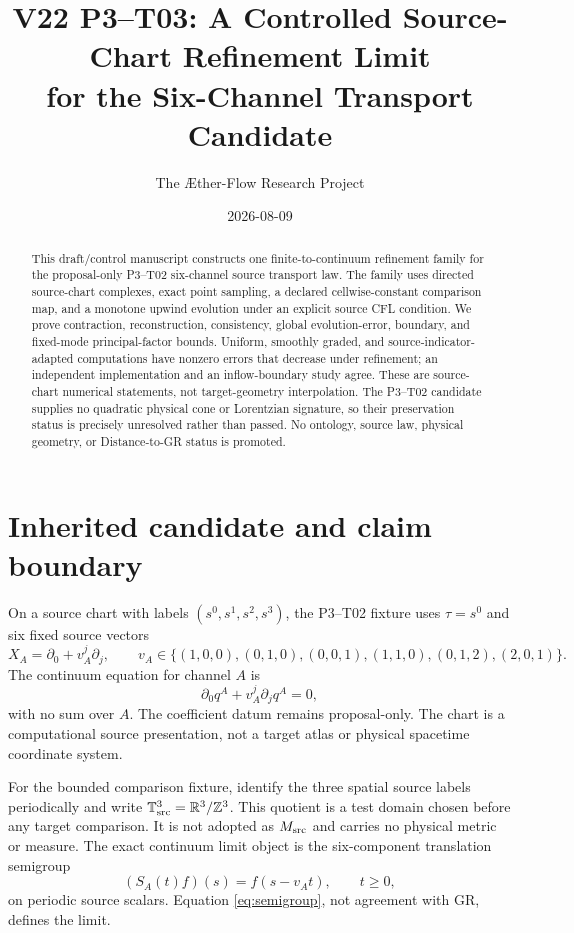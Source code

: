 \documentclass[11pt]{article}
\title{V22 P3--T03: A Controlled Source-Chart Refinement Limit\\
for the Six-Channel Transport Candidate}
\author{The \AE ther-Flow Research Project}
\date{2026-08-09}
\newcommand{\R}{\mathbb R}
\newcommand{\T}{\mathbb T}
\begin{document}
\maketitle

\begin{abstract}
This draft/control manuscript constructs one finite-to-continuum refinement
family for the proposal-only P3--T02 six-channel source transport law.  The
family uses directed source-chart complexes, exact point sampling, a declared
cellwise-constant comparison map, and a monotone upwind evolution under an
explicit source CFL condition.  We prove contraction, reconstruction,
consistency, global evolution-error, boundary, and fixed-mode
principal-factor bounds.  Uniform, smoothly graded, and source-indicator-
adapted computations have nonzero errors that decrease under refinement; an
independent implementation and an inflow-boundary study agree.  These are
source-chart numerical statements, not target-geometry interpolation.  The
P3--T02 candidate supplies no quadratic physical cone or Lorentzian signature,
so their preservation status is precisely unresolved rather than passed.  No
ontology, source law, physical geometry, or Distance-to-GR status is promoted.
\end{abstract}

\section{Inherited candidate and claim boundary}

On a source chart with labels $(s^0,s^1,s^2,s^3)$, the P3--T02 fixture uses
$\tau=s^0$ and six fixed source vectors
\begin{equation}
  X_A=\partial_0+v_A^j\partial_j,
  \qquad
  v_A\in\{(1,0,0),(0,1,0),(0,0,1),(1,1,0),(0,1,2),(2,0,1)\}.
  \label{eq:velocities}
\end{equation}
The continuum equation for channel $A$ is
\begin{equation}
  \partial_0 q^A+v_A^j\partial_j q^A=0,
  \label{eq:transport}
\end{equation}
with no sum over $A$.  The coefficient datum remains proposal-only.  The
chart is a computational source presentation, not a target atlas or physical
spacetime coordinate system.

For the bounded comparison fixture, identify the three spatial source labels
periodically and write $\T^3_{\rm src}=\R^3/\mathbb Z^3$.  This quotient is a
test domain chosen before any target comparison.  It is not adopted as
$M_{\rm src}$ and carries no physical metric or measure.  The exact continuum
limit object is the six-component translation semigroup
\begin{equation}
  (S_A(t)f)(s)=f(s-v_A t),\qquad t\ge0,
  \label{eq:semigroup}
\end{equation}
on periodic source scalars.  Equation \eqref{eq:semigroup}, not agreement with
GR, defines the limit.
\end{document}
